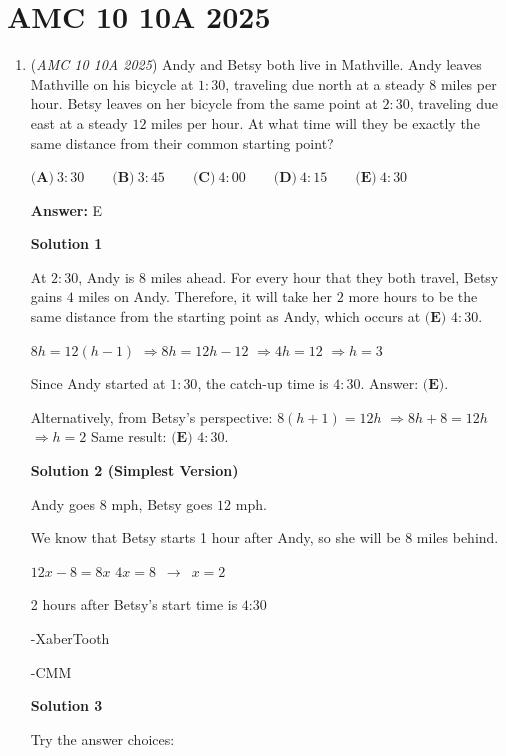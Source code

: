 \section{AMC 10 10A 2025}
        \begin{enumerate}
        	\item (\textit{AMC 10 10A 2025}) Andy and Betsy both live in Mathville. Andy leaves Mathville on his bicycle at $1:30$, traveling due north at a steady $8$ miles per hour. Betsy leaves on her bicycle from the same point at $2:30$, traveling due east at a steady $12$ miles per hour. At what time will they be exactly the same distance from their common starting point?


 $\textbf{(A)}~3:30\qquad\textbf{(B)}~3:45\qquad\textbf{(C)}~4:00\qquad\textbf{(D)}~4:15\qquad\textbf{(E)}~4:30$

 \textbf{Answer: }E



\textbf{Solution 1}

At $2{:}30$, Andy is $8$ miles ahead. For every hour that they both travel, Betsy gains $4$ miles on Andy. Therefore, it will take her $2$ more hours to be the same distance from the starting point as Andy, which occurs at $\boxed{\textbf{(E) } 4{:}30}$.

 $8h = 12(h-1)$ $\Rightarrow 8h = 12h - 12$ $\Rightarrow 4h = 12$ $\Rightarrow h = 3$

 Since Andy started at $1{:}30$, the catch-up time is $4{:}30$.  Answer: $\textbf{(E)}$.

 Alternatively, from Betsy's perspective:  $8(h+1) = 12h$ $\Rightarrow 8h + 8 = 12h$ $\Rightarrow h = 2$  Same result: $\textbf{(E) } 4{:}30$.

 



\textbf{Solution 2 (Simplest Version)}

Andy goes $8$ mph, Betsy goes $12$ mph.  

 We know that Betsy starts 1 hour after Andy, so she will be 8 miles behind.

 $12x - 8 = 8x$
$4x = 8$ $\,\rightarrow\,$ $x = 2$

 2 hours after Betsy's start time is $\boxed{\text{4:30}}$

 -XaberTooth

 -CMM

 



\textbf{Solution 3}

Try the answer choices:


\end{enumerate}
